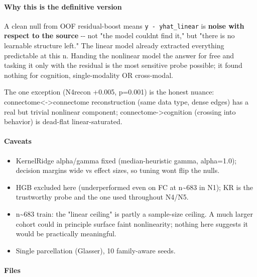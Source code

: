 \paragraph{Why this is the definitive version}\label{why-this-is-the-definitive-version}

A clean null from OOF residual-boost means \texttt{y\ -\ yhat\_linear} is \textbf{noise with respect to the source} -\/- not "the model couldn\textquotesingle t find it," but "there is no learnable structure left." The linear model already extracted everything predictable at this n. Handing the nonlinear model the answer for free and tasking it only with the residual is the most sensitive probe possible; it found nothing for cognition, single-modality OR cross-modal.

The one exception (N4recon +0.005, p=0.001) is the honest nuance: connectome\textless-\textgreater connectome reconstruction (same data type, dense edges) has a real but trivial nonlinear component; connectome-\textgreater cognition (crossing into behavior) is dead-flat linear-saturated.

\paragraph{Caveats}\label{caveats-3}

\begin{itemize}
\tightlist
\item
  KernelRidge alpha/gamma fixed (median-heuristic gamma, alpha=1.0); decision margins wide vs effect sizes, so tuning won\textquotesingle t flip the nulls.
\item
  HGB excluded here (underperformed even on FC at n\textasciitilde683 in N1); KR is the trustworthy probe and the one used throughout N4/N5.
\item
  n\textasciitilde683 train: the "linear ceiling" is partly a sample-size ceiling. A much larger cohort could in principle surface faint nonlinearity; nothing here suggests it would be practically meaningful.
\item
  Single parcellation (Glasser), 10 family-aware seeds.
\end{itemize}

\paragraph{Files}\label{files-4}

